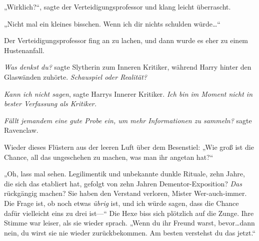 „Wirklich?“, sagte der Verteidigungsprofessor und klang leicht überrascht.

„Nicht mal ein kleines bisschen. Wenn ich dir nichts schulden würde…“

Der Verteidigungsprofessor fing an zu lachen, und dann wurde es eher zu einem Hustenanfall.

\emph{Was denkst du?} sagte Slytherin zum Inneren Kritiker, während Harry hinter den Glaswänden zuhörte. \emph{Schauspiel oder Realität?}

\emph{Kann ich nicht sagen}, sagte Harrys Innerer Kritiker. \emph{Ich bin im Moment nicht in bester Verfassung als Kritiker.}

\emph{Fällt jemandem eine gute Probe ein, um mehr Informationen zu sammeln?} sagte Ravenclaw.

Wieder dieses Flüstern aus der leeren Luft über dem Besenstiel:
„Wie groß ist die Chance, all das ungeschehen zu machen, was man ihr angetan hat?“

„Oh, lass mal sehen. Legilimentik und unbekannte dunkle Rituale, zehn Jahre, die sich das etabliert hat, gefolgt von zehn Jahren Dementor-Exposition? \emph{Das} rückgängig machen? Sie haben den Verstand verloren, Mister Wer-auch-immer. Die Frage ist, ob noch etwas \emph{übrig} ist, und ich würde sagen, dass die Chance dafür vielleicht eins zu drei ist—“ Die Hexe biss sich plötzlich auf die Zunge. Ihre Stimme war leiser, als sie wieder sprach.
„Wenn du ihr Freund warst, bevor…dann nein, du wirst sie nie wieder zurückbekommen. Am besten verstehst du das jetzt.“

